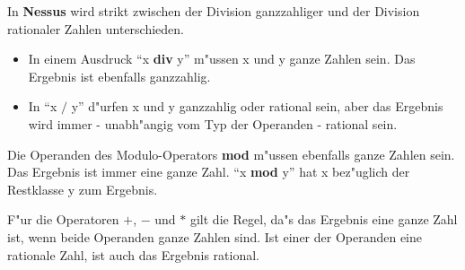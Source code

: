   
 
  

  In {\bf
Nessus} wird strikt zwischen der Division ganzzahliger und der
Division rationaler Zahlen
unterschieden.   
 
  

\begin{itemize}
  \item In einem Ausdruck ``x {\bf div} y'' m"ussen x und y ganze
Zahlen sein. Das Ergebnis ist 
	ebenfalls ganzzahlig.  
  \item In ``x $/$ y'' d"urfen x und y ganzzahlig oder rational sein, aber das Ergebnis
wird immer - 
	unabh"angig vom Typ der Operanden - rational sein. 
\end{itemize}

Die Operanden des Modulo-Operators {\bf mod} m"ussen
ebenfalls ganze Zahlen sein. Das Ergebnis ist immer eine ganze
Zahl. ``x {\bf mod} y''
hat x bez"uglich der Restklasse y zum Ergebnis.
  
 
  

F"ur die Operatoren $+$, $-$ und $*$ gilt die Regel, da"s das Ergebnis
eine ganze Zahl ist, wenn beide Operanden ganze Zahlen sind. Ist einer
der Operanden eine rationale Zahl, ist auch das
Ergebnis rational.  

